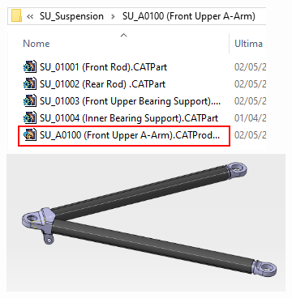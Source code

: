 \begin{figure}
    \centering
    \begin{subfigure}{.5\textwidth}
        \centering
        \includegraphics[width=\textwidth]{img/tria_file.png}
        \includegraphics[width=\textwidth]{img/tria_screen.png}
    \end{subfigure}{}
    \begin{subfigure}{.25\textwidth}
        \centering

\end{subfigure}
\end{figure}
